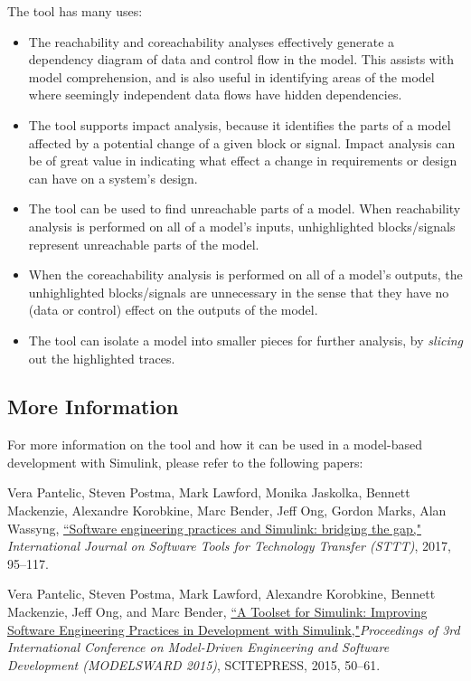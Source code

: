 \documentclass{article}
\begin{document}
The tool has many uses:
\begin{itemize}

	\item The reachability and coreachability analyses effectively generate a dependency diagram of data and control flow in the model. This assists with model comprehension, and is also useful in identifying areas of the model where seemingly independent data flows have hidden dependencies.
	\item The tool supports impact analysis, because it identifies the parts of a model affected by a potential change of a given block or signal. Impact analysis can be of great value in indicating what effect a change in requirements or design can have on a system's design.
	\item The tool can be used to find unreachable parts of a model. When reachability analysis is performed on all of a model's inputs, unhighlighted blocks/signals represent unreachable parts of the model. 
	\item When the coreachability analysis is performed on all of a model's outputs, the unhighlighted blocks/signals are unnecessary in the sense that they have no (data or control) effect on the outputs of the model.
	\item The tool can isolate a model into smaller pieces for further analysis, by \emph{slicing} out the highlighted traces.
\end{itemize}

\subsection*{More Information}
For more information on the tool and how it can be used in a model-based development with Simulink, please refer to the following papers:

\vspace{1em}
Vera Pantelic, Steven Postma, Mark Lawford, Monika Jaskolka, Bennett Mackenzie, Alexandre Korobkine, Marc Bender, Jeff Ong, Gordon Marks, Alan Wassyng, \href{https://link.springer.com/article/10.1007/s10009-017-0450-9}{``Software engineering practices and Simulink: bridging the gap,"} \textit{International Journal on Software Tools for Technology Transfer (STTT)}, 2017, 95--117.

\vspace{1em}
Vera Pantelic, Steven Postma, Mark Lawford, Alexandre Korobkine, Bennett Mackenzie, Jeff Ong, and Marc Bender, \href{http://www.cas.mcmaster.ca/~lawford/papers/MODELSWARD2015.pdf}{``A Toolset for Simulink: Improving Software Engineering Practices in Development with Simulink,"}\textit{Proceedings of 3rd International Conference on Model-Driven Engineering and Software Development (MODELSWARD 2015)}, SCITEPRESS, 2015, 50--61.
\end{document}
